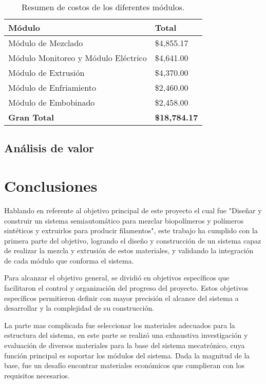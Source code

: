 \documentclass[14pt,oneside]{extarticle} %
\begin{document}
\begin{table}[h!]
\centering
\begin{tabular}{| m{6cm} | m{4cm} |}
\hline
\textbf{Módulo} & \textbf{Total} \\ \hline
Módulo de Mezclado & \$4,855.17 \\ \hline
Módulo Monitoreo y Módulo Eléctrico & \$4,641.00 \\ \hline
Módulo de Extrusión & \$4,370.00 \\ \hline
Módulo de Enfriamiento & \$2,460.00 \\ \hline
Módulo de Embobinado & \$2,458.00 \\ \hline
\textbf{Gran Total} & \textbf{\$18,784.17} \\ \hline
\end{tabular}
\caption{Resumen de costos de los diferentes módulos.}
\label{Tab:CostoGeneral}
\end{table}

\subsection{Análisis de valor}

\newpage
\section{Conclusiones}

Hablando en referente al objetivo principal de este proyecto el cual fue "Diseñar y construir un sistema semiautomático para mezclar biopolímeros y polímeros sintéticos y extruirlos para producir filamentos", este trabajo ha cumplido con la primera parte del objetivo, logrando el diseño y construcción de un sistema capaz de realizar la mezcla y extrusión de estos materiales, y validando la integración de cada módulo que conforma el sistema.

Para alcanzar el objetivo general, se dividió en objetivos específicos que facilitaron el control y organización del progreso del proyecto. Estos objetivos específicos permitieron definir con mayor precisión el alcance del sistema a desarrollar y la complejidad de su construcción.

La parte mas complicada fue seleccionar los materiales adecuados para la estructura del sistema, en este parte se realizó una exhaustiva investigación y evaluación de diversos materiales para la base del sistema mecatrónico, cuya función principal es soportar los módulos del sistema. Dada la magnitud de la base, fue un desafío encontrar materiales económicos que cumplieran con los requisitos necesarios.
\end{document}
